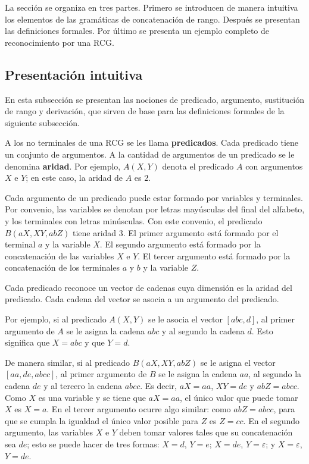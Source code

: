 \documentclass{report}
\theoremstyle{definition}
\theoremstyle{plain}
\theoremstyle{remark}
\begin{document}
La sección se organiza en tres partes. Primero se introducen de manera
intuitiva los elementos de las gramáticas de concatenación de rango.
Después se presentan las definiciones formales. Por último se presenta
un ejemplo completo de reconocimiento por una RCG.

\subsection{Presentación intuitiva}

En esta subsección se presentan las nociones de predicado, argumento,
sustitución de rango y derivación, que sirven de base para las
definiciones formales de la siguiente subsección.

A los no terminales de una RCG se les llama \textbf{predicados}. Cada
predicado tiene un conjunto de argumentos. A la cantidad de argumentos
de un predicado se le denomina \textbf{aridad}. Por ejemplo, $A(X, Y)$
denota el predicado $A$ con argumentos $X$ e $Y$; en este caso, la
aridad de $A$ es $2$.

Cada argumento de un predicado puede estar formado por variables y
terminales. Por convenio, las variables se denotan por letras mayúsculas
del final del alfabeto, y los terminales con letras minúsculas. Con este
convenio, el predicado $B(aX, XY, abZ)$ tiene aridad $3$. El primer
argumento está formado por el terminal $a$ y la variable $X$. El
segundo argumento está formado por la concatenación de las variables
$X$ e $Y$. El tercer argumento está formado por la concatenación de los
terminales $a$ y $b$ y la variable $Z$.

Cada predicado reconoce un vector de cadenas cuya dimensión es la
aridad del predicado. Cada cadena del vector se asocia a un argumento
del predicado.

Por ejemplo, si al predicado $A(X, Y)$ se le asocia el vector $[abc,
d]$, al primer argumento de $A$ se le asigna la cadena $abc$ y al
segundo la cadena $d$. Esto significa que $X = abc$ y que $Y = d$.

De manera similar, si al predicado $B(aX, XY, abZ)$ se le asigna el
vector $[aa, de, abcc]$, al primer argumento de $B$ se le asigna la
cadena $aa$, al segundo la cadena $de$ y al tercero la cadena $abcc$.
Es decir, $aX = aa$, $XY = de$ y $abZ = abcc$. Como $X$ es una variable
y se tiene que $aX = aa$, el único valor que puede tomar $X$ es $X = a$.
En el tercer argumento ocurre algo similar: como $abZ = abcc$, para que
se cumpla la igualdad el único valor posible para $Z$ es $Z = cc$. En el
segundo argumento, las variables $X$ e $Y$ deben tomar valores tales que
su concatenación sea $de$; esto se puede hacer de tres formas:
$X = d$, $Y = e$; $X = de$, $Y = \varepsilon$; y $X = \varepsilon$,
$Y = de$.
\end{document}
